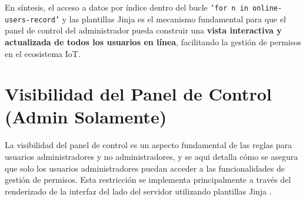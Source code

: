 \documentclass{report}
\begin{document}
En síntesis, el acceso a datos por índice dentro del bucle \texttt{'for n in online-users-record'} y las plantillas Jinja es el mecanismo fundamental 
para que el panel de control del administrador pueda construir una \textbf{vista interactiva y actualizada de todos los usuarios en línea}, 
facilitando la gestión de permisos en el ecosistema IoT.

\section{Visibilidad del Panel de Control (Admin Solamente)}
La  visibilidad del panel de control es un aspecto fundamental de las reglas para usuarios administradores y no 
administradores, y se aqui detalla cómo se asegura que solo los usuarios administradores puedan acceder a las funcionalidades 
de gestión de permisos. Esta restricción se implementa principalmente a través del renderizado de la interfaz del lado del 
servidor utilizando plantillas Jinja .
\end{document}
